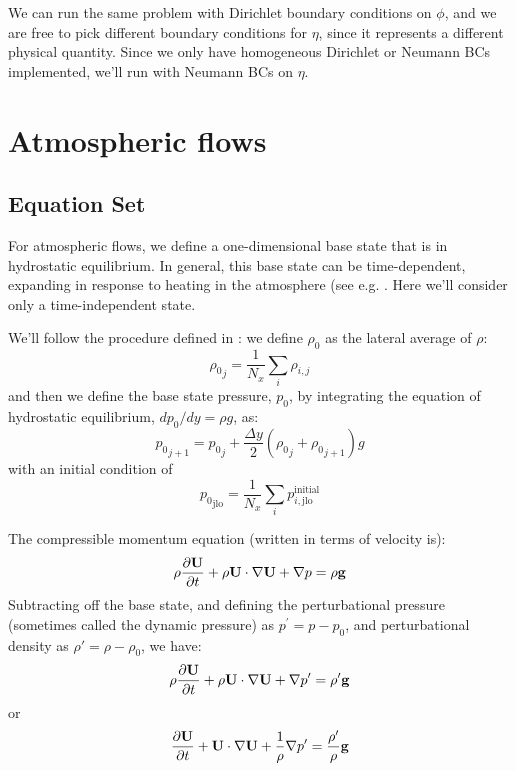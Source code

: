 We can run the same problem with Dirichlet boundary conditions on $\phi$,
and we are free to pick different boundary conditions for $\eta$, since
it represents a different physical quantity.  Since we only have homogeneous
Dirichlet or Neumann BCs implemented, we'll run with Neumann BCs on $\eta$.



\section{Atmospheric flows}
\label{sec:lm:atm} 

\subsection{Equation Set}

For atmospheric flows, we define a one-dimensional base state that is
in hydrostatic equilibrium.  In general, this base state can be
time-dependent, expanding in response to heating in the atmosphere
(see e.g. \cite{almgren:2000,ABRZ:II}.  Here we'll consider only a
time-independent state.

We'll follow the procedure defined in \cite{multilevel}: we define
$\rho_0$ as the lateral average of $\rho$:
\begin{equation}
{\rho_0}_j = \frac{1}{N_x} \sum_i \rho_{i,j}
\end{equation}
and then we define the base state pressure, $p_0$, by integrating the
equation of hydrostatic equilibrium, $dp_0/dy = \rho g$, as:
\begin{equation}
{p_0}_{j+1} = {p_0}_j + \frac{\Delta y}{2} ({\rho_0}_j + {\rho_0}_{j+1}) g
\end{equation}
with an initial condition of 
\begin{equation}
{p_0}_\mathrm{jlo} = \frac{1}{N_x} \sum_{i} p^\mathrm{initial}_{i,\mathrm{jlo}}
\end{equation}

The compressible momentum equation (written in terms of velocity is):
\begin{equation}
\rho \frac{\partial {\bf U}}{\partial t} + \rho {\bf U} \cdot \nabla {\bf U} + \nabla p = \rho {\bf g}
\end{equation}
Subtracting off the base state, and defining the perturbational
pressure (sometimes called the dynamic pressure) as $p^\prime = p -
p_0$, and perturbational density as $\rho' = \rho - \rho_0$, we have:
\begin{equation}
\rho \frac{\partial {\bf U}}{\partial t} + \rho {\bf U} \cdot \nabla {\bf U} + \nabla p' = \rho' {\bf g}
\end{equation}
or 
\begin{equation}
\frac{\partial {\bf U}}{\partial t} + {\bf U} \cdot \nabla {\bf U} + \frac{1}{\rho} \nabla p^\prime = 
   \frac{\rho^\prime}{\rho} {\bf g}
\end{equation}


